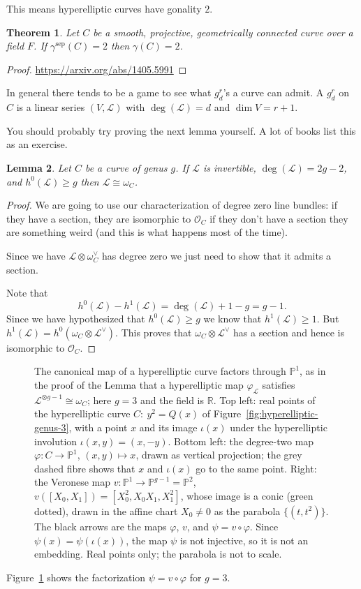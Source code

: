 \documentclass[12pt]{article}
\numberwithin{equation}{section}
\newtheorem{theorem}{Theorem}[subsection]
\newtheorem{lemma}[theorem]{Lemma}
\theoremstyle{definition}
\theoremstyle{remark}
\newcommand{\RR}{\mathbb{R}}
\newcommand{\Ocal}{\mathcal{O}}
\newcommand{\PP}{\mathbb{P}}
\newcommand{\Lcal}{\mathcal{L}}
\newcommand{\sep}{\operatorname{sep}}
\begin{document}
This means hyperelliptic curves have gonality $2$.  
\begin{theorem}
	Let $C$ be a smooth, projective, geometrically connected curve over a field $F$.
	If $\gamma^{\sep}(C)=2$ then $\gamma(C)=2$. 
\end{theorem}
\begin{proof}
	\url{https://arxiv.org/abs/1405.5991}
\end{proof}
In general there tends to be a game to see what $g^r_d$'s a curve can admit. 
A $g^r_d$ on $C$ is a linear series $(V,\Lcal)$ with $\deg(\Lcal)=d$ and $\dim V = r+1$.


You should probably try proving the next lemma yourself. 
A lot of books list this as an exercise. 
\begin{lemma}
	Let $C$ be a curve of genus $g$. 
	If $\Lcal$ is invertible, $\deg(\Lcal)=2g-2$, and $h^0(\Lcal)\geq g$ then $\Lcal\cong \omega_C$. 
\end{lemma}
\begin{proof}
	We are going to use our characterization of degree zero line bundles: if they have a section, they are isomorphic to $\Ocal_C$ if they don't have a section they are something weird (and this is what happens most of the time). 
	
	Since we have $\Lcal\otimes \omega_C^{\vee}$ has degree zero we just need to show that it admits a section. 
	
	Note that 
	$$ h^0(\Lcal) - h^1(\Lcal) = \deg(\Lcal)+1-g = g-1.$$
	Since we have hypothesized that $h^0(\Lcal)\geq g$ we know that $h^1(\Lcal)\geq 1$. 
	But $h^1(\Lcal)=h^0(\omega_C\otimes \Lcal^{\vee})$.
	This proves that $\omega_C\otimes\Lcal^{\vee}$ has a section and hence is isomorphic to $\Ocal_C$.
\end{proof}

\begin{figure}[H]
\centering

\caption{The canonical map of a hyperelliptic curve factors through $\PP^1$, as in the proof of the Lemma that a hyperelliptic map $\varphi_{\Lcal}$ satisfies $\Lcal^{\otimes g-1}\cong\omega_C$; here $g=3$ and the field is $\RR$. Top left: real points of the hyperelliptic curve $C:\ y^2=Q(x)$ of Figure~\ref{fig:hyperelliptic-genus-3}, with a point $x$ and its image $\iota(x)$ under the hyperelliptic involution $\iota(x,y)=(x,-y)$. Bottom left: the degree-two map $\varphi:C\to\PP^1$, $(x,y)\mapsto x$, drawn as vertical projection; the grey dashed fibre shows that $x$ and $\iota(x)$ go to the same point. Right: the Veronese map $v:\PP^1\to\PP^{g-1}=\PP^2$, $v([X_0,X_1])=[X_0^2,X_0X_1,X_1^2]$, whose image is a conic (green dotted), drawn in the affine chart $X_0\neq0$ as the parabola $\{(t,t^2)\}$. The black arrows are the maps $\varphi$, $v$, and $\psi=v\circ\varphi$. Since $\psi(x)=\psi(\iota(x))$, the map $\psi$ is not injective, so it is not an embedding. Real points only; the parabola is not to scale.}\label{fig:hyperelliptic-canonical-map}
\end{figure}
Figure~\ref{fig:hyperelliptic-canonical-map} shows the factorization $\psi=v\circ\varphi$ for $g=3$.
\end{document}
